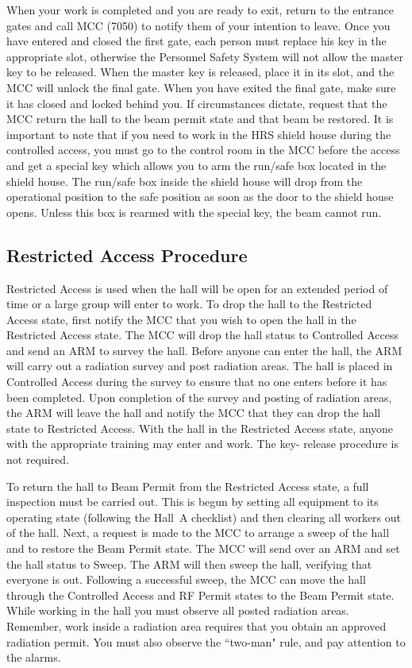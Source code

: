 When your work is completed and you are ready to exit, return to the
entrance gates and call MCC (7050) to notify them of your intention to leave.
 Once you have entered and closed the first gate, each person must
replace his key in the appropriate slot, otherwise the Personnel
Safety System will not allow the master key to be released. When the
master key is released, place it in its slot, and the MCC will unlock
the final gate. When you have exited the final gate, make sure it has
closed and locked behind you. If circumstances dictate, request that
the MCC return the hall to the beam permit state and that beam be
restored.  It is important to note that if you need to work in the HRS
shield house during the controlled access, you must go to the control
room in the MCC before the access and get a special key which allows
you to arm the run/safe box located in the shield house. The run/safe
box inside the shield house will drop from the operational position to
the safe position as soon as the door to the shield house
opens. Unless this box is rearmed with the special key, the beam
cannot run.

\begin{safetyen}{10}{10}
\subsection{Restricted Access Procedure} 
\end{safetyen}

Restricted Access is used when the hall will be open for an extended
period of time or a large group will enter to work. To drop the hall
to the Restricted Access state, first notify the MCC that you wish to
open the hall in the Restricted Access state. The MCC will drop the
hall status to Controlled Access and send an ARM to survey the
hall. Before anyone can enter the hall, the ARM will carry out a
radiation survey and post radiation areas.  The hall is placed in
Controlled Access during the survey to ensure that no one enters
before it has been completed. Upon completion of the survey and
posting of radiation areas, the ARM will leave the hall and notify the
MCC that they can drop the hall state to Restricted Access. With the
hall in the Restricted Access state, anyone with the appropriate
training may enter and work.  The key- release procedure is not
required.
 
To return the hall to Beam Permit from the Restricted Access state, a
full inspection must be carried out. This is begun by setting all
equipment to its operating state (following the Hall~A checklist) and
then clearing all workers out of the hall. Next, a request is made to
the MCC to arrange a sweep of the hall and to restore the Beam Permit
state. The MCC will send over an ARM and set the hall status to Sweep.
The ARM will then sweep the hall, verifying that everyone is
out. Following a successful sweep, the MCC can move the hall through
the Controlled Access and RF Permit states to the Beam Permit state.
While working in the hall you must observe all posted radiation areas.
Remember, work inside a radiation area requires that you obtain an
approved radiation permit. You must also observe the ``two-man" rule,
and pay attention to the alarms.


